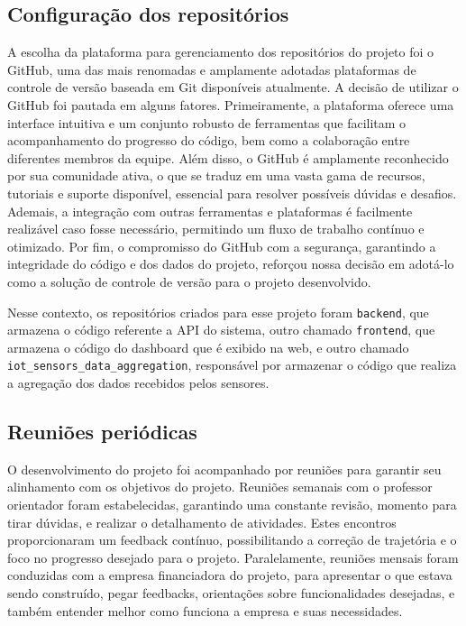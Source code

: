 \subsection{Configuração dos repositórios}
A escolha da plataforma para gerenciamento dos repositórios do projeto foi o GitHub, uma das mais renomadas e amplamente adotadas plataformas de controle de versão baseada em Git disponíveis atualmente. A decisão de utilizar o GitHub foi pautada em alguns fatores. Primeiramente, a plataforma oferece uma interface intuitiva e um conjunto robusto de ferramentas que facilitam o acompanhamento do progresso do código, bem como a colaboração entre diferentes membros da equipe. Além disso, o GitHub é amplamente reconhecido por sua comunidade ativa, o que se traduz em uma vasta gama de recursos, tutoriais e suporte disponível, essencial para resolver possíveis dúvidas e desafios. Ademais, a integração com outras ferramentas e plataformas é facilmente realizável caso fosse necessário, permitindo um fluxo de trabalho contínuo e otimizado. Por fim, o compromisso do GitHub com a segurança, garantindo a integridade do código e dos dados do projeto, reforçou nossa decisão em adotá-lo como a solução de controle de versão para o projeto desenvolvido. 

Nesse contexto, os repositórios criados para esse projeto foram \texttt{backend}, que armazena o código referente a API do sistema, outro chamado \texttt{frontend}, que armazena o código do dashboard que é exibido na web, e outro chamado \texttt{iot\_sensors\_data\_aggregation}, responsável por armazenar o código que realiza a agregação dos dados recebidos pelos sensores.


\subsection{Reuniões periódicas}
O desenvolvimento do projeto foi acompanhado por reuniões para garantir seu alinhamento com os objetivos do projeto. Reuniões semanais com o professor orientador foram estabelecidas, garantindo uma constante revisão, momento para tirar dúvidas, e realizar o detalhamento de atividades. Estes encontros proporcionaram um feedback contínuo, possibilitando a correção de trajetória e o foco no progresso desejado para o projeto. Paralelamente, reuniões mensais foram conduzidas com a empresa financiadora do projeto, para apresentar o que estava sendo construído, pegar feedbacks, orientações sobre funcionalidades desejadas, e também entender melhor como funciona a empresa e suas necessidades.

